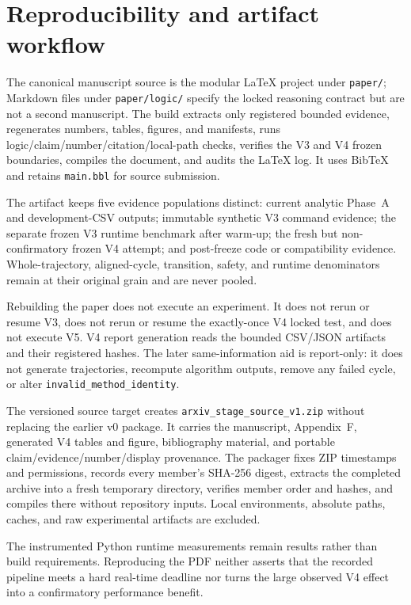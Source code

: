 \section{Reproducibility and artifact workflow}
\label{app:reproducibility}

The canonical manuscript source is the modular \LaTeX{} project under
\texttt{paper/}; Markdown files under \texttt{paper/logic/} specify the locked
reasoning contract but are not a second manuscript.  The build extracts only
registered bounded evidence, regenerates numbers, tables, figures, and
manifests, runs logic/claim/number/citation/local-path checks, verifies the V3
and V4 frozen boundaries, compiles the document, and audits the \LaTeX{} log.
It uses BibTeX and retains \texttt{main.bbl} for source submission.

The artifact keeps five evidence populations distinct: current analytic
Phase~A and development-CSV outputs; immutable synthetic V3 command evidence;
the separate frozen V3 runtime benchmark after warm-up; the fresh but
non-confirmatory frozen V4 attempt; and post-freeze code or compatibility
evidence.  Whole-trajectory, aligned-cycle, transition, safety, and runtime
denominators remain at their original grain and are never pooled.

Rebuilding the paper does not execute an experiment.  It does not rerun or
resume V3, does not rerun or resume the exactly-once V4 locked test, and does
not execute V5.  V4 report generation reads the bounded CSV/JSON artifacts and
their registered hashes.  The later same-information aid is report-only: it
does not generate trajectories, recompute algorithm outputs, remove any failed
cycle, or alter \texttt{invalid\_method\_identity}.

The versioned source target creates
\texttt{arxiv\_stage\_source\_v1.zip} without replacing the earlier v0
package.  It carries the manuscript, Appendix~F, generated V4 tables and
figure, bibliography material, and portable claim/evidence/number/display
provenance.  The packager fixes ZIP timestamps and permissions, records every
member's SHA-256 digest, extracts the completed archive into a fresh temporary
directory, verifies member order and hashes, and compiles there without
repository inputs.  Local environments, absolute paths, caches, and raw
experimental artifacts are excluded.

The instrumented Python runtime measurements remain results rather than build
requirements.  Reproducing the PDF neither asserts that the recorded pipeline
meets a hard real-time deadline nor turns the large observed V4 effect into a
confirmatory performance benefit.
